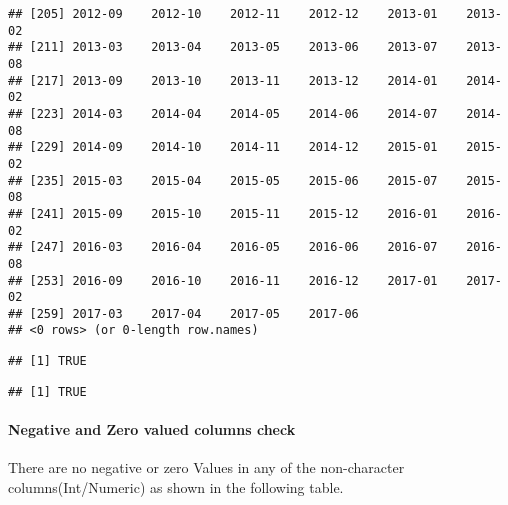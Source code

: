 \documentclass[
]{article}
\begin{document}
\begin{verbatim}
## [205] 2012-09    2012-10    2012-11    2012-12    2013-01    2013-02   
## [211] 2013-03    2013-04    2013-05    2013-06    2013-07    2013-08   
## [217] 2013-09    2013-10    2013-11    2013-12    2014-01    2014-02   
## [223] 2014-03    2014-04    2014-05    2014-06    2014-07    2014-08   
## [229] 2014-09    2014-10    2014-11    2014-12    2015-01    2015-02   
## [235] 2015-03    2015-04    2015-05    2015-06    2015-07    2015-08   
## [241] 2015-09    2015-10    2015-11    2015-12    2016-01    2016-02   
## [247] 2016-03    2016-04    2016-05    2016-06    2016-07    2016-08   
## [253] 2016-09    2016-10    2016-11    2016-12    2017-01    2017-02   
## [259] 2017-03    2017-04    2017-05    2017-06   
## <0 rows> (or 0-length row.names)
\end{verbatim}

\begin{verbatim}
## [1] TRUE
\end{verbatim}

\begin{verbatim}
## [1] TRUE
\end{verbatim}

\hypertarget{negative-and-zero-valued-columns-check}{%
\paragraph{Negative and Zero valued columns
check}\label{negative-and-zero-valued-columns-check}}

There are no negative or zero Values in any of the non-character
columns(Int/Numeric) as shown in the following table.
\end{document}
